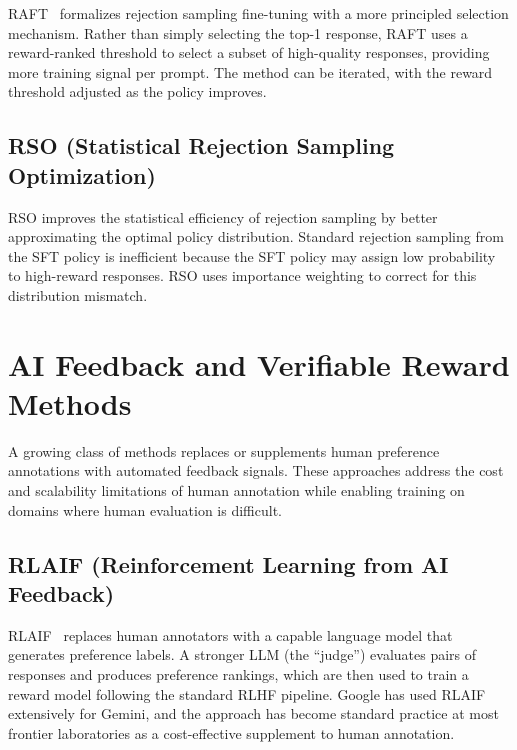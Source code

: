 \documentclass[12pt]{article}
\begin{document}
RAFT~\cite{Dong2023RAFT} formalizes rejection sampling fine-tuning with a more principled selection mechanism. Rather than simply selecting the top-1 response, RAFT uses a reward-ranked threshold to select a subset of high-quality responses, providing more training signal per prompt. The method can be iterated, with the reward threshold adjusted as the policy improves.

\subsection{RSO (Statistical Rejection Sampling Optimization)}

RSO improves the statistical efficiency of rejection sampling by better approximating the optimal policy distribution. Standard rejection sampling from the SFT policy is inefficient because the SFT policy may assign low probability to high-reward responses. RSO uses importance weighting to correct for this distribution mismatch.


\section{AI Feedback and Verifiable Reward Methods}

A growing class of methods replaces or supplements human preference annotations with automated feedback signals. These approaches address the cost and scalability limitations of human annotation while enabling training on domains where human evaluation is difficult.

\subsection{RLAIF (Reinforcement Learning from AI Feedback)}

RLAIF~\cite{Lee2023RLAIF} replaces human annotators with a capable language model that generates preference labels. A stronger LLM (the ``judge'') evaluates pairs of responses and produces preference rankings, which are then used to train a reward model following the standard RLHF pipeline. Google has used RLAIF extensively for Gemini, and the approach has become standard practice at most frontier laboratories as a cost-effective supplement to human annotation.
\end{document}
